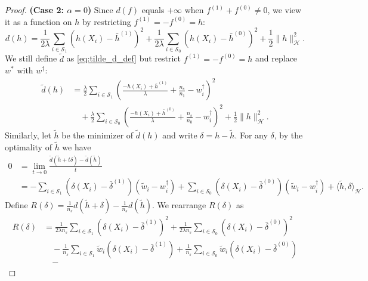 \documentclass[12pt]{article}
\begin{document}
\begin{proof}
	
	\bigskip
	
	\noindent\textbf{(Case 2: $\alpha = 0$)}
	Since $d(f)$ equals $+\infty$ when $f^{(1)} + f^{(0)} \neq 0$, we view it as a function on $h$ by restricting $f^{(1)} = - f^{(0)} = h$:
	\begin{equation*}
		d(h) = 
		\frac{1}{2\lambda} \sum_{i \in \mathcal{S}_1} (h(X_i) - \bar{h}^{(1)})^2 +
		\frac{1}{2\lambda} \sum_{i \in \mathcal{S}_0} (h(X_i) - \bar{h}^{(0)})^2 +
		\frac{1}{2} \| h \|_\mathcal{H}^2
		.\end{equation*}
	We still define $\tilde{d}$ as \eqref{eq:tilde_d_def} but restrict $f^{(1)} = - f^{(0)} = h$ and replace $w^*$ with $w^\dagger$:
	\begin{align*}
		\tilde{d}(h) 
		&=
		\frac{\lambda}{2} \sum_{i \in \mathcal{S}_1} \left( \frac{-h(X_i) + \bar{h}^{(1)}}{\lambda} + \frac{n_s}{n_1} - w^\dagger_i \right)^2 
		\\&\quad+
		\frac{\lambda}{2} \sum_{i \in \mathcal{S}_0} \left( \frac{-h(X_i) + \bar{h}^{(0)}}{\lambda} + \frac{n_s}{n_0} - w^\dagger_i \right)^2 +
		\frac{1}{2} \| h \|_\mathcal{H}^2
		.\end{align*}
	Similarly, let $\tilde{h}$ be the minimizer of $\tilde{d}(h)$ and write $\delta = h - \tilde{h}$. For any $\delta$, by the optimality of $\tilde{h}$ we have
	\begin{equation}
		\label{eq:tilde_h_eq}
		\begin{aligned}
			0 &=
			\lim_{t \rightarrow 0} \frac{\tilde{d}(\tilde{h} + t\delta) - \tilde{d}(\tilde{h})}{t}
			\\&=
			-\sum_{i \in \mathcal{S}_1}(\delta(X_i) - \bar{\delta}^{(1)})(\tilde{w}_i - w_i^\dagger)
			+\sum_{i \in \mathcal{S}_0}(\delta(X_i) - \bar{\delta}^{(0)})(\tilde{w}_i - w_i^\dagger)
			+ \langle \tilde{h}, \delta \rangle_\mathcal{H}
			.\end{aligned}
	\end{equation}
	Define $R(\delta) = \frac{1}{n_s}d(\tilde{h}+\delta) - \frac{1}{n_s}d(\tilde{h})$. We rearrange $R(\delta)$ as
	\begin{align*}
		R(\delta) &=
		\frac{1}{2\lambda n_s} \sum_{i \in \mathcal{S}_1} (\delta(X_i) - \bar{\delta}^{(1)})^2 +
		\frac{1}{2\lambda n_s} \sum_{i \in \mathcal{S}_0} (\delta(X_i) - \bar{\delta}^{(0)})^2
		\\&\quad -
		\frac{1}{n_s} \sum_{i \in \mathcal{S}_1} \tilde{w}_i (\delta(X_i) - \bar{\delta}^{(1)}) +
		\frac{1}{n_s} \sum_{i \in \mathcal{S}_0} \tilde{w}_i (\delta(X_i) - \bar{\delta}^{(0)}) 
		\\&\quad -

\end{align*}
\end{proof}
\end{document}

